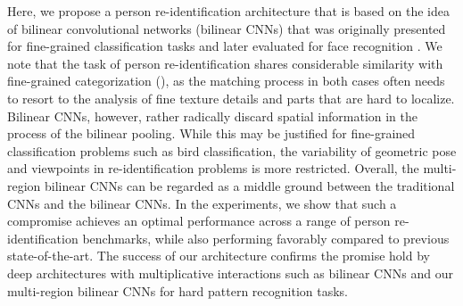 Here, we propose a person re-identification architecture that is based on the idea of bilinear convolutional networks (bilinear CNNs) \citep{lin2015bilinear} that was originally presented for fine-grained classification tasks and later evaluated for face recognition \citep{roychowdhury2015face}. We note that the task of person re-identification shares considerable similarity with fine-grained categorization (), as the matching process in both cases often needs to resort to the analysis of fine texture details and parts that are hard to localize.  Bilinear CNNs, however, rather radically discard spatial information in the process of the bilinear pooling. While this may be justified for fine-grained classification problems such as bird classification, the variability of geometric pose and viewpoints in re-identification problems is more restricted. Overall, the multi-region bilinear CNNs can be regarded as a middle ground between the traditional CNNs and the bilinear CNNs. In the experiments, we show that such a compromise achieves an optimal performance across a range of person re-identification benchmarks, while also performing favorably compared to previous state-of-the-art. The success of our architecture confirms the promise hold by deep architectures with multiplicative interactions such as bilinear CNNs and our multi-region bilinear CNNs for hard pattern recognition tasks.

